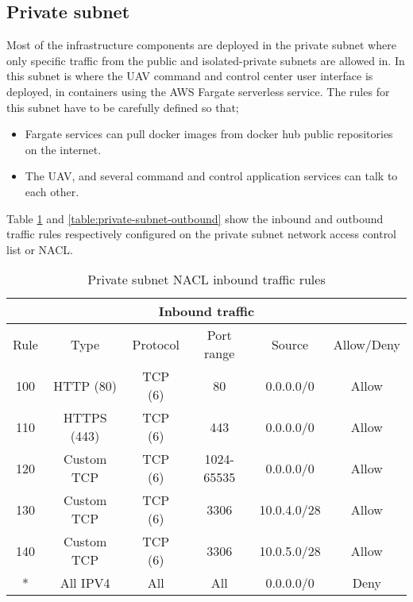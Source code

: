 \subsection{Private subnet}
\label{private-subnet}

Most of the infrastructure components are deployed in the private subnet where only specific traffic from the public and isolated-private subnets are allowed in. In this subnet is where the UAV command and control center user interface is deployed, in containers using the AWS Fargate serverless service. The rules for this subnet have to be carefully defined so that;

\begin{itemize}
    \item Fargate services can pull docker images from docker hub public repositories on the internet.
    \item The UAV, and several command and control application services can talk to each other.
\end{itemize}

Table \ref{table:private-subnet-inbound} and \ref{table:private-subnet-outbound} show the inbound and outbound traffic rules respectively configured on the private subnet network access control list or NACL.

\begin{table}[H]
    \centering
    \begin{tabular}{|c|c|c|c|c|c|}
        \hline
        \multicolumn{6}{|c|}{Inbound traffic}                                 \\
        \hline
        Rule & Type        & Protocol & Port range & Source      & Allow/Deny \\
        \hline
        100  & HTTP (80)   & TCP (6)  & 80         & 0.0.0.0/0   & Allow      \\
        \hline
        110  & HTTPS (443) & TCP (6)  & 443        & 0.0.0.0/0   & Allow      \\
        \hline
        120  & Custom TCP  & TCP (6)  & 1024-65535 & 0.0.0.0/0   & Allow      \\
        \hline
        130  & Custom TCP  & TCP (6)  & 3306       & 10.0.4.0/28 & Allow      \\
        \hline
        140  & Custom TCP  & TCP (6)  & 3306       & 10.0.5.0/28 & Allow      \\
        \hline
        *    & All IPV4    & All      & All        & 0.0.0.0/0   & Deny       \\
        \hline
    \end{tabular}
    \caption{Private subnet NACL inbound traffic rules}
    \label{table:private-subnet-inbound}
\end{table}

